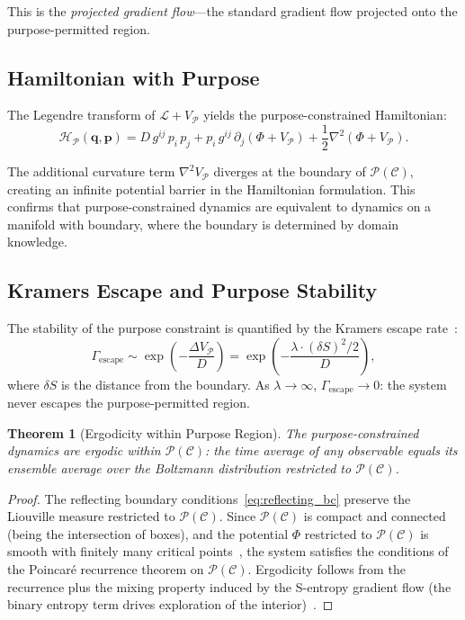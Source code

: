 \documentclass[aps,prd,twocolumn,superscriptaddress,floatfix,nofootinbib]{revtex4-2}
\newtheorem{theorem}{Theorem}[section]
\theoremstyle{remark}
\newcommand{\qvec}{\mathbf{q}}
\newcommand{\Lag}{\mathcal{L}}
\newcommand{\Ham}{\mathcal{H}}
\newcommand{\Pot}{\Phi}
\newcommand{\Purpose}{\mathcal{P}}
\newcommand{\Context}{\mathcal{C}}
\begin{document}
This is the \emph{projected gradient flow}---the standard gradient flow projected onto the purpose-permitted region.

\subsection{Hamiltonian with Purpose}

The Legendre transform of $\Lag + V_\Purpose$ yields the purpose-constrained Hamiltonian:
\begin{equation}
\Ham_\Purpose(\qvec, \mathbf{p}) = D\,g^{ij}\,p_i\,p_j + p_i\,g^{ij}\,\partial_j(\Pot + V_\Purpose) + \frac{1}{2}\nabla^2(\Pot + V_\Purpose).
\label{eq:hamiltonian_purpose}
\end{equation}

The additional curvature term $\nabla^2 V_\Purpose$ diverges at the boundary of $\Purpose(\Context)$, creating an infinite potential barrier in the Hamiltonian formulation.
This confirms that purpose-constrained dynamics are equivalent to dynamics on a manifold with boundary, where the boundary is determined by domain knowledge.

\subsection{Kramers Escape and Purpose Stability}

The stability of the purpose constraint is quantified by the Kramers escape rate~\cite{kramers1940brownian}:
\begin{equation}
\Gamma_{\mathrm{escape}} \sim \exp\!\left(-\frac{\Delta V_\Purpose}{D}\right) = \exp\!\left(-\frac{\lambda \cdot (\delta S)^2 / 2}{D}\right),
\label{eq:kramers}
\end{equation}
where $\delta S$ is the distance from the boundary.
As $\lambda \to \infty$, $\Gamma_{\mathrm{escape}} \to 0$: the system never escapes the purpose-permitted region.

\begin{theorem}[Ergodicity within Purpose Region]
\label{thm:ergodicity}
The purpose-constrained dynamics are ergodic within $\Purpose(\Context)$: the time average of any observable equals its ensemble average over the Boltzmann distribution restricted to $\Purpose(\Context)$.
\end{theorem}

\begin{proof}
The reflecting boundary conditions~\eqref{eq:reflecting_bc} preserve the Liouville measure restricted to $\Purpose(\Context)$.
Since $\Purpose(\Context)$ is compact and connected (being the intersection of boxes), and the potential $\Pot$ restricted to $\Purpose(\Context)$ is smooth with finitely many critical points~\cite{sachikonye2026lagrangian}, the system satisfies the conditions of the Poincar\'{e} recurrence theorem on $\Purpose(\Context)$.
Ergodicity follows from the recurrence plus the mixing property induced by the S-entropy gradient flow (the binary entropy term drives exploration of the interior)~\cite{poincare1890,landau1980statistical}.
\end{proof}
\end{document}
